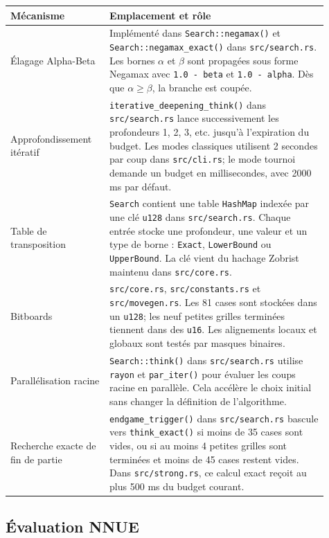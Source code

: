\documentclass{pssbmac}
\begin{document}
\begin{center}
\small
\begin{tabular}{p{0.28\linewidth}p{0.63\linewidth}}
\hline
\rowcolor{TableHeader}
\textbf{Mécanisme} & \textbf{Emplacement et rôle} \\
\hline
Élagage Alpha-Beta & Implémenté dans \texttt{Search::negamax()} et \texttt{Search::negamax\_exact()} dans \texttt{src/search.rs}. Les bornes \(\alpha\) et \(\beta\) sont propagées sous forme Negamax avec \texttt{1.0 - beta} et \texttt{1.0 - alpha}. Dès que \(\alpha \geq \beta\), la branche est coupée. \\
Approfondissement itératif & \texttt{iterative\_deepening\_think()} dans \texttt{src/search.rs} lance successivement les profondeurs 1, 2, 3, etc. jusqu'à l'expiration du budget. Les modes classiques utilisent 2 secondes par coup dans \texttt{src/cli.rs}; le mode tournoi demande un budget en millisecondes, avec 2000 ms par défaut. \\
Table de transposition & \texttt{Search} contient une table \texttt{HashMap} indexée par une clé \texttt{u128} dans \texttt{src/search.rs}. Chaque entrée stocke une profondeur, une valeur et un type de borne : \texttt{Exact}, \texttt{LowerBound} ou \texttt{UpperBound}. La clé vient du hachage Zobrist maintenu dans \texttt{src/core.rs}. \\
Bitboards & \texttt{src/core.rs}, \texttt{src/constants.rs} et \texttt{src/movegen.rs}. Les 81 cases sont stockées dans un \texttt{u128}; les neuf petites grilles terminées tiennent dans des \texttt{u16}. Les alignements locaux et globaux sont testés par masques binaires. \\
Parallélisation racine & \texttt{Search::think()} dans \texttt{src/search.rs} utilise \texttt{rayon} et \texttt{par\_iter()} pour évaluer les coups racine en parallèle. Cela accélère le choix initial sans changer la définition de l'algorithme. \\
Recherche exacte de fin de partie & \texttt{endgame\_trigger()} dans \texttt{src/search.rs} bascule vers \texttt{think\_exact()} si moins de 35 cases sont vides, ou si au moins 4 petites grilles sont terminées et moins de 45 cases restent vides. Dans \texttt{src/strong.rs}, ce calcul exact reçoit au plus 500 ms du budget courant. \\
\hline
\end{tabular}
\end{center}

\subsection{Évaluation NNUE}
\end{document}
